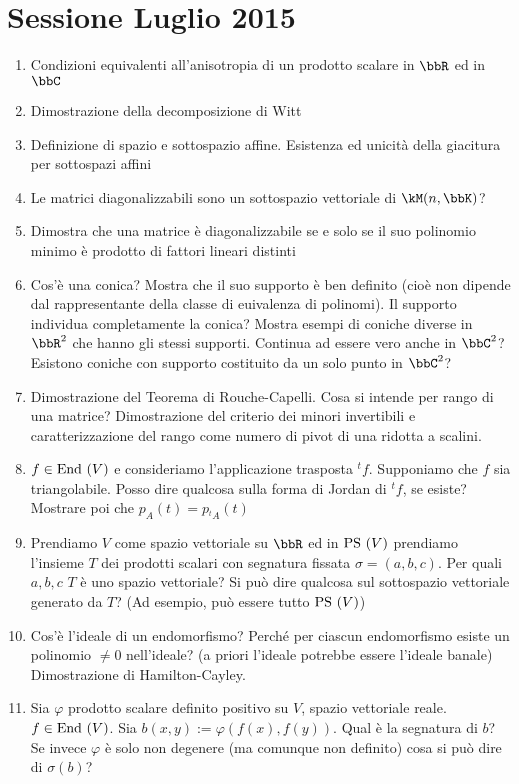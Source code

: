 \documentclass[a4paper,NoNotes,GeneralMath]{stdmdoc}
\begin{document}
	\section*{Sessione Luglio 2015}
	\begin{enumerate}
		\item Condizioni equivalenti all'anisotropia di un prodotto scalare in $\bbR$ ed in $\bbC$
		\item Dimostrazione della decomposizione di Witt
		\item Definizione di spazio e sottospazio affine. Esistenza ed unicità della giacitura per sottospazi affini
		\item Le matrici diagonalizzabili sono un sottospazio vettoriale di $\kM(n,\bbK)$?
		\item Dimostra che una matrice è diagonalizzabile se e solo se il suo polinomio minimo è prodotto di fattori lineari distinti
		\item Cos'è una conica? Mostra che il suo supporto è ben definito (cioè non dipende dal rappresentante della classe di euivalenza di polinomi). Il supporto individua completamente la conica? Mostra esempi di coniche diverse in $\bbR^2$ che hanno gli stessi supporti. Continua ad essere vero anche in $\bbC^2$? Esistono coniche con supporto costituito da un solo punto in $\bbC^2$?
		\item Dimostrazione del Teorema di Rouche-Capelli. Cosa si intende per rango di una matrice? Dimostrazione del criterio dei minori invertibili e caratterizzazione del rango come numero di pivot di una ridotta a scalini.
		\item $f\in\mbox{End }(V)$ e consideriamo l'applicazione trasposta ${}^tf$. Supponiamo che $f$ sia triangolabile. Posso dire qualcosa sulla forma di Jordan di ${}^tf$, se esiste? Mostrare poi che $p_A(t) = p_{{}^tA}(t)$
		\item Prendiamo $V$ come spazio vettoriale su $\bbR$ ed in $\mbox{PS }(V)$ prendiamo l'insieme $T$ dei prodotti scalari con segnatura fissata $\sigma = (a,b,c)$. Per quali $a,b,c$ $T$ è uno spazio vettoriale? Si può dire qualcosa sul sottospazio vettoriale generato da $T$? (Ad esempio, può essere tutto $\mbox{PS }(V)$)
		\item Cos'è l'ideale di un endomorfismo? Perché per ciascun endomorfismo esiste un polinomio $\neq 0$ nell'ideale? (a priori l'ideale potrebbe essere l'ideale banale) Dimostrazione di Hamilton-Cayley.
		\item Sia $\varphi$ prodotto scalare definito positivo su $V$, spazio vettoriale reale. $f\in\mbox{End }(V)$. Sia $b(x,y) := \varphi(f(x), f(y))$. Qual è la segnatura di $b$? Se invece $\varphi$ è solo non degenere (ma comunque non definito) cosa si può dire di $\sigma(b)$?

\end{enumerate}
\end{document}
